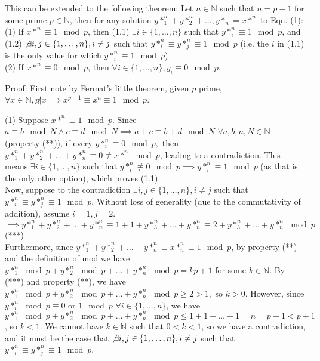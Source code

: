 \documentclass{article}
\begin{document}
\begin{flushleft}
\vspace{.1in}

This can be extended to the following theorem: Let $n \in \mathbb{N}$ such that $n = p - 1$ for some prime $p \in \mathbb{N}$, then for any solution $y*_1^n + y*_2^n + \ldots, y*_n = x*^n$ to Eqn. (1): 
(1) If $x*^n \equiv 1 \mod p$, then (1.1) $\exists i \in \{1, \ldots, n\}$ such that $y*_i^n \equiv 1 \mod p$, and (1.2) $\not\exists i, j \in \{1, \ldots, n\}, i \neq j$ such that $y*_i^n \equiv y*_j^n \equiv 1 \mod p$ (i.e. the $i$ in (1.1) is the only value for which $y*_i^n \equiv 1 \mod p$) \\
(2) If $x*^n \equiv 0 \mod p$, then $\forall i \in \{1, \ldots, n\}, y_i \equiv 0 \mod p$.

Proof: First note by Fermat's little theorem, given $p$ prime, $\forall x \in \mathbb{N}, p \not| x \implies x^{p - 1} \equiv x^n \equiv 1 \mod p$.

\vspace{.1in}

(1) Suppose $x*^n \equiv 1 \mod p$. Since $a \equiv b \mod N \land c \equiv d \mod N \implies a + c \equiv b + d \mod N$ $\forall a, b, n, N \in \mathbb{N}$ (property (**)), if every $y*_i^n \equiv 0 \mod p,$ then $y*_1^n + y*_2^n + \ldots + y*_n^n \equiv 0 \not\equiv x*^n \mod p$, leading to a contradiction. This means $\exists i \in \{1, \ldots, n\}$ such that $y*_i^n \not\equiv 0 \mod p \implies y*_i^n \equiv 1 \mod p$ (as that is the only other option), which proves (1.1). \\
Now, suppose to the contradiction $\exists i, j \in \{1, \ldots, n\}, i \neq j$ such that $y*_i^n \equiv y*_j^n \equiv 1 \mod p$. Without loss of generality (due to the commutativity of addition), assume $i = 1, j = 2$. \\
$\implies y*_1^n + y*_2^n + \ldots + y*_n^n \equiv 1 + 1 + y*_3^n + \ldots + y*_n^n \equiv 2 + y*_3^n + \ldots + y*_n^n \mod p$ (***) \\
Furthermore, since $y*_1^n + y*_2^n + \ldots + y*_n^n \equiv x*_n^n \equiv 1 \mod p$, by property (**) and the definition of mod we have $y*_1^n \mod p + y*_2^n \mod p + \ldots + y*_n^n \mod p = kp+1$ for some $k \in \mathbb{N}$. By (***) and property (**), we have $y*_1^n \mod p + y*_2^n \mod p + \ldots + y*_n^n \mod p \geq 2 > 1,$ so $k > 0$. However, since $y*_i^n \mod p \equiv 0$ or $1 \mod p$ $\forall i \in \{1, \ldots, n\}$, we have $y*_1^n \mod p + y*_2^n \mod p + \ldots + y*_n^n \mod p \leq 1 + 1 + \ldots + 1 = n = p - 1 < p + 1$, so $k < 1$. We cannot have $k \in \mathbb{N}$ such that $0 < k < 1$, so we have a contradiction, and it must be the case that $\not\exists i, j \in \{1, \ldots, n\}, i \neq j$ such that $y*_i^n \equiv y*_j^n \equiv 1 \mod p$.


\end{flushleft}
\end{document}
